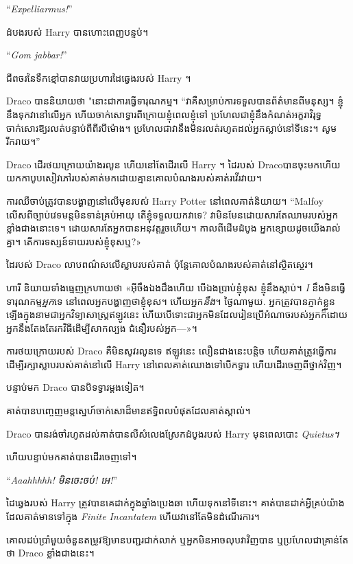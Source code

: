 {{{{{{“\emph{Expelliarmus!}”

ដំបងរបស់ Harry បានហោះពេញបន្ទប់។

“\emph{Gom jabbar!}”

ជីពចរនៃទឹកខ្មៅបានវាយប្រហារដៃឆ្វេងរបស់ Harry ។

Draco បាននិយាយថា "នោះជាការធ្វើទារុណកម្ម។ “វាគឺសម្រាប់ការទទួលបានព័ត៌មានពីមនុស្ស។ ខ្ញុំនឹងទុកវានៅលើអ្នក ហើយចាក់សោទ្វារពីក្រោយខ្ញុំពេលខ្ញុំទៅ ប្រហែលជាខ្ញុំនឹងកំណត់អក្ខរាវិរុទ្ធចាក់សោរឱ្យរលត់បន្ទាប់ពីពីរបីម៉ោង។ ប្រហែល​ជា​វា​នឹង​មិន​រលត់​រហូត​ដល់​អ្នក​ស្លាប់​នៅ​ទីនេះ។ សូមរីករាយ។”

Draco ដើរថយក្រោយយ៉ាងរលូន ហើយនៅតែដើរលើ Harry ។ ដៃ​របស់​ Draco ​បាន​ចុះ​មក​ហើយ​យក​កាបូប​សៀវភៅ​របស់​គាត់​មក​ដោយ​គ្មាន​គោល​បំណង​របស់​គាត់​រវើរវាយ។

ការឈឺចាប់ត្រូវបានបង្ហាញនៅលើមុខរបស់ Harry Potter នៅពេលគាត់និយាយ។ “Malfoy លើសពីច្បាប់វេទមន្តមិនទាន់គ្រប់អាយុ តើខ្ញុំទទួលយកវាទេ? វាមិនមែនដោយសារតែឈាមរបស់អ្នកខ្លាំងជាងនោះទេ។ ដោយសារតែអ្នកបានអនុវត្តរួចហើយ។ កាល​ពី​ដើម​ដំបូង អ្នក​ខ្សោយ​ដូច​យើង​រាល់​គ្នា។ តើការទស្សន៍ទាយរបស់ខ្ញុំខុសឬ?»

ដៃ​របស់​ Draco លាប​ពណ៌​ស​លើ​ស្លាប​របស់​គាត់ ប៉ុន្តែ​គោល​បំណង​របស់​គាត់​នៅ​ស្ថិត​ស្ថេរ។

ហារី និយាយ​ទាំង​ធ្មេញ​ក្រហាយ​ថា «​អ៊ីចឹង​ឯង​ដឹង​ហើយ បើ​ឯង​ប្រាប់​ខ្ញុំ​ខុស ខ្ញុំ​នឹង​ស្តាប់។ \emph{I} នឹងមិនធ្វើទារុណកម្ម\emph{អ្នក}ទេ នៅពេលអ្នកបង្ហាញថាខ្ញុំខុស។ ហើយអ្នក\emph{នឹង}។ ថ្ងៃណាមួយ. អ្នក​ត្រូវ​បាន​ភ្ញាក់​ខ្លួន​ឡើង​ក្នុង​នាម​ជា​អ្នក​វិទ្យាសាស្ត្រ​ឥឡូវ​នេះ ហើយ​បើ​ទោះ​ជា​អ្នក​មិន​ដែល​រៀន​ប្រើ​អំណាច​របស់​អ្នក​ក៏​ដោយ អ្នក​នឹង​តែង​តែ​រក​វិធី​ដើម្បី​សាកល្បង ជំនឿ​របស់​អ្នក—»។

ការថយក្រោយរបស់ Draco គឺមិនសូវរលូនទេ ឥឡូវនេះ លឿនជាងនេះបន្តិច ហើយគាត់ត្រូវធ្វើការដើម្បីរក្សាស្លាបរបស់គាត់នៅលើ Harry នៅពេលគាត់ឈោងទៅបើកទ្វារ ហើយដើរចេញពីថ្នាក់វិញ។

បន្ទាប់មក Draco បានបិទទ្វារម្តងទៀត។

គាត់បានបញ្ចេញមន្តស្នេហ៍ចាក់សោដ៏មានឥទ្ធិពលបំផុតដែលគាត់ស្គាល់។

Draco បានរង់ចាំរហូតដល់គាត់បានលឺសំលេងស្រែកដំបូងរបស់ Harry មុនពេលបោះ \emph{Quietus។}

ហើយបន្ទាប់មកគាត់បានដើរចេញទៅ។

\later

“\emph{Aaahhhhh! មិនចេះចប់! អេ!}”

ដៃ​ឆ្វេង​របស់ Harry ត្រូវ​បាន​គេ​ដាក់​ក្នុង​ឆ្នាំង​ប្រេង​ឆា ហើយ​ទុក​នៅ​ទីនោះ។ គាត់បានដាក់អ្វីគ្រប់យ៉ាងដែលគាត់មានទៅក្នុង \emph{Finite Incantatem} ហើយវានៅតែមិនដំណើរការ។

គោលដប់ប្រាំមួយ​ចំនួន​តម្រូវ​ឱ្យ​មាន​បញ្ជរ​ជាក់លាក់ ឬ​អ្នក​មិន​អាច​លុប​វា​វិញ​បាន ឬ​ប្រហែល​ជា​គ្រាន់តែ​ថា Draco ខ្លាំង​ជាង​នេះ។

}}}}}}

